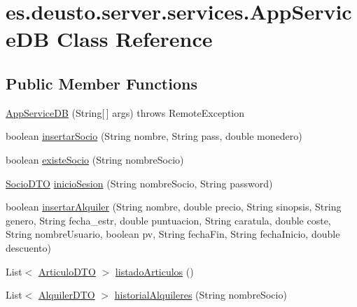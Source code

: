 \hypertarget{classes_1_1deusto_1_1server_1_1services_1_1_app_service_d_b}{}\section{es.\+deusto.\+server.\+services.\+App\+Service\+DB Class Reference}
\label{classes_1_1deusto_1_1server_1_1services_1_1_app_service_d_b}
\subsection*{Public Member Functions}
\begin{DoxyCompactItemize}
\item 
\mbox{\hyperlink{classes_1_1deusto_1_1server_1_1services_1_1_app_service_d_b_a409668aba7daa8751863e3cf0fd4b809}{App\+Service\+DB}} (String\mbox{[}$\,$\mbox{]} args)  throws Remote\+Exception 
\item 
boolean \mbox{\hyperlink{classes_1_1deusto_1_1server_1_1services_1_1_app_service_d_b_a7fde38ff7e7e24adfd572d3044c0cb18}{insertar\+Socio}} (String nombre, String pass, double monedero)
\item 
boolean \mbox{\hyperlink{classes_1_1deusto_1_1server_1_1services_1_1_app_service_d_b_acc18376b7ef7057ec88bb3321f0195f0}{existe\+Socio}} (String nombre\+Socio)
\item 
\mbox{\hyperlink{classes_1_1deusto_1_1server_1_1dto_1_1_socio_d_t_o}{Socio\+D\+TO}} \mbox{\hyperlink{classes_1_1deusto_1_1server_1_1services_1_1_app_service_d_b_a05bb94be097db4d37ed29533ffef22bd}{inicio\+Sesion}} (String nombre\+Socio, String password)
\item 
boolean \mbox{\hyperlink{classes_1_1deusto_1_1server_1_1services_1_1_app_service_d_b_a1d8255fd9345da3dac1396df7ce42468}{insertar\+Alquiler}} (String nombre, double precio, String sinopsis, String genero, String fecha\+\_\+estr, double puntuacion, String caratula, double coste, String nombre\+Usuario, boolean pv, String fecha\+Fin, String fecha\+Inicio, double descuento)
\item 
List$<$ \mbox{\hyperlink{classes_1_1deusto_1_1server_1_1dto_1_1_articulo_d_t_o}{Articulo\+D\+TO}} $>$ \mbox{\hyperlink{classes_1_1deusto_1_1server_1_1services_1_1_app_service_d_b_ad5b41086b12914887243cf56ebae5bb5}{listado\+Articulos}} ()
\item 
List$<$ \mbox{\hyperlink{classes_1_1deusto_1_1server_1_1dto_1_1_alquiler_d_t_o}{Alquiler\+D\+TO}} $>$ \mbox{\hyperlink{classes_1_1deusto_1_1server_1_1services_1_1_app_service_d_b_a362c47422ee87ea594ccf6c7884ce053}{historial\+Alquileres}} (String nombre\+Socio)

\end{DoxyCompactItemize}
